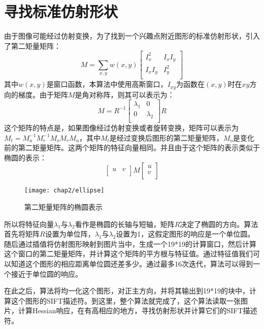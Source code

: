   \section{寻找标准仿射形状}
    由于图像可能经过仿射变换，为了找到一个兴趣点附近图形的标准仿射形状，引入了第二矩量矩阵\cite{ericsson2003affine,Perdoch-CVPR-2009,mikolajczyk2004scale,mikolajczyk2002affine,chiu2006matching}：
    \begin{equation*}
      M=\sum_{x,y}w(x,y)\left[\begin{array}{cc}
      I_x^2 & I_xI_y \\
      I_xI_y & I_y^2 \\
      \end{array}\right]
    \end{equation*}
    其中$w(x,y)$是窗口函数，本算法中使用高斯窗口，$I_{xy}$为函数在$(x,y)$时在$xy$方向的梯度。由于矩阵$M$是角对称阵，则其可以表示为：
    \begin{equation}
      M=R^{-1}\left[\begin{array}{cc}
      \lambda_1 & 0 \\
      0 & \lambda_2 \\
      \end{array}\right]R
    \end{equation}
    这个矩阵的特点是，如果图像经过仿射变换或者旋转变换，矩阵可以表示为$M_t=M_a^{-1}M_r^{-1}M_oM_rM_a$，其中$M_t$是经过变换后图形的第二矩量矩阵，$M_o$是变化前的第二矩量矩阵。这两个矩阵的特征向量相同。并且由于这个矩阵的表示类似于椭圆的表示：
    \begin{equation*}
    \left[\begin{array}{cc}
    u & v \\
    \end{array}\right]M
    \left[\begin{array}{c}
    u \\
    v \\
    \end{array}\right]
    \end{equation*}
    \begin{wrapfigure}{r}{0.45\textwidth}
      \centering
      \texttt{[image: chap2/ellipse]}
      \caption{第二矩量矩阵的椭圆表示}
    \end{wrapfigure}
    所以将特征向量$\lambda_1$与$\lambda_2$看作是椭圆的长轴与短轴，矩阵$R$决定了椭圆的方向。算法首先将矩阵$R$设置为单位阵，$\lambda_1$与$\lambda_2$设置为1，这假定图形的响应是一个单位圆。随后通过插值将仿射图形映射到图片当中，生成一个19*19的计算窗口，然后计算这个窗口的第二矩量矩阵，并计算这个矩阵的平方根与特征值。通过特征值我们可以知道这个图形的相应距离单位圆还差多少。通过最多16次迭代，算法可以得到一个接近于单位圆的响应。
    \par
    在此之后，算法将均一化这个图形，对正主方向，并将其输出到19*19的块中，计算这个图形的SIFT描述符。到这里，整个算法就完成了，这个算法读取一张图片，计算Hessian响应，在有高相应的地方，寻找仿射形状并计算它们的SIFT描述符。


